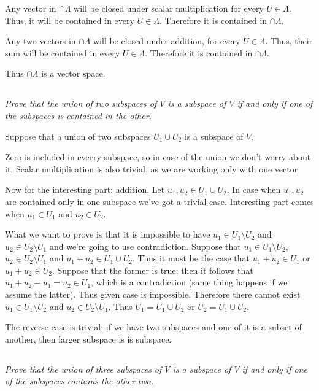 \documentclass[10pt,oneside,titlepage]{book}
\begin{document}
Any vector in $\cap \Lambda$ will be closed under scalar multiplication
for every $U \in \Lambda$. Thus, it will be contained in every
$U \in \Lambda$. Therefore it is contained in $\cap \Lambda$.


Any two  vectors in $\cap \Lambda$ will be closed under addition,
for every $U \in \Lambda$. Thus, their sum  will be contained in every
$U \in \Lambda$. Therefore it is contained in $\cap \Lambda$.

Thus $\cap \Lambda$ is a vector space.

\subsection{}
\textit{Prove that the union of two subspaces of $V$ is a subspace of $V$
  if and only if one of the subspaces is contained in the other.}

Suppose that a union of two subspaces $U_1 \cup U_2$
is a subspace of $V$.

Zero is included in eveery subspace, so in case of the union we don't worry
about it.
Scalar multiplication is also trivial, as we are working only with one vector.

Now for the interesting part: addition. Let $u_1, u_2 \in U_1 \cup U_2$.
In case when $u_1, u_2$ are contained only in one subspace we've got
a trivial case. Interesting part comes when $u_1 \in U_1$ and $u_2 \in U_2$.

What we want to prove is that it is impossible to have
$u_1 \in U_1 \setminus U_2$ and $u_2 \in U_2 \setminus U_1$ and we're going to
use contradiction. Suppose that
$u_1 \in U_1 \setminus U_2$, $u_2 \in U_2 \setminus U_1$ and
$u_1 + u_2 \in U_1 \cup U_2$. Thus it must be the case that
$u_1 + u_2 \in U_1$ or $u_1 + u_2 \in U_2$. Suppose that the former is true;
then it follows that $u_1 + u_2 - u_1 = u_2 \in U_1$, which is a contradiction
(same thing happens if we assume the latter). Thus given case is impossible.
Therefore there cannot exist $u_1 \in U_1 \setminus U_2$ and
$u_2 \in U_2 \setminus U_1$. Thus
$U_1 = U_1 \cup U_2$ or $U_2 = U_1 \cup U_2$.

The reverse case is trivial: if we have two subspaces and
one of it is a subset of another, then larger subspace is is subspace.

\subsection{}
\textit{Prove that the union of three subspaces of $V$ is a subspace of
  $V$ if and only if one of the subspaces contains the other two.}
\end{document}
